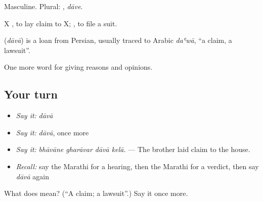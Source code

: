 Masculine. Plural: , \emph{dāve}.

X   , to lay claim to X;   , to file a suit.

\begin{cousinweb}
\textbf{} (\emph{dāvā}) is a loan from Persian, usually traced to Arabic \emph{daʿwā}, \textquotedblleft{}a claim, a lawsuit\textquotedblright{}.
\end{cousinweb}

\begin{grammarlens}[title={What you've built}]
One more word for giving reasons and opinions.
\end{grammarlens}

\subsection*{Your turn}
\begin{itemize}
\raggedright
  \item \emph{Say it:} \emph{dāvā}
  \item \emph{Say it:} \emph{dāvā}, once more
  \item \emph{Say it:} \emph{bhāvāne gharāvar dāvā kelā.} — The brother laid claim to the house.
  \item \emph{Recall:} say the Marathi for a hearing, then the Marathi for a verdict, then say \emph{dāvā} again
\end{itemize}

\begin{tcolorbox}[breakable,colback=teal!4,colframe=teal!35!black,title={Before you move on}]
What does  mean? (\textquotedblleft{}A claim; a lawsuit\textquotedblright{}.) Say it once more.
\end{tcolorbox}
